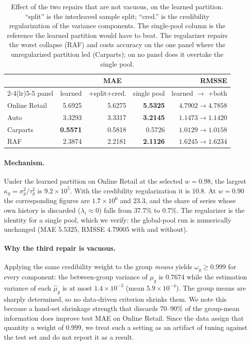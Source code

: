 \documentclass[twocolumn,10pt]{article}
\newcommand{\best}[1]{\textbf{#1}}
\begin{document}
\begin{table}[t]
\centering
\caption{Effect of the two repairs that are not vacuous, on the learned
partition. ``split'' is the interleaved sample split; ``cred.'' is the
credibility regularization of the variance components. The single-pool
column is the reference the learned partition would have to beat. The
regularizer repairs the worst collapse (RAF) and costs accuracy on the
one panel where the unregularized partition led (Carparts); on no panel
does it overtake the single pool.}
\label{tab:repairs}
\begin{tabular}{lrrrr}
\toprule
& \multicolumn{3}{c}{MAE} & RMSSE\\
\cmidrule(lr){2-4}\cmidrule(lr){5-5}
panel & learned & \;+split+cred. & single pool & learned $\to$ +both\\
\midrule
Online Retail & 5.6925 & 5.6275 & \best{5.5325} & $4.7902\to4.7858$\\
Auto & 3.3293 & 3.3317 & \best{3.2145} & $1.1473\to1.1420$\\
Carparts & \best{0.5571} & 0.5818 & 0.5726 & $1.0129\to1.0158$\\
RAF & 2.3874 & 2.2181 & \best{2.1126} & $1.6245\to1.6234$\\
\bottomrule
\end{tabular}
\end{table}

\paragraph{Mechanism.} Under the learned partition on Online Retail at
the selected $w=0.98$, the largest $\kappa_g=\sigma_g^2/\tau_g^2$ is
$9.2\times10^{5}$. With the credibility regularization it is $10.8$. At
$w=0.90$ the corresponding figures are $1.7\times10^{6}$ and $23.3$, and
the share of series whose own history is discarded
($\lambda_i\approx0$) falls from $37.7\%$ to $0.7\%$. The regularizer is
the identity for a single pool, which we verify: the global-pool run is
numerically unchanged (MAE $5.5325$, RMSSE $4.79005$ with and without).

\paragraph{Why the third repair is vacuous.} Applying the same
credibility weight to the group \emph{means} yields $\omega_g\ge0.999$
for every component: the between-group variance of $\mu_g$ is $0.7674$
while the estimation variance of each $\hat\mu_g$ is at most
$1.4\times10^{-3}$ (mean $5.9\times10^{-4}$). The group means are
sharply determined, so no data-driven criterion shrinks them. We note
this because a hand-set shrinkage strength that discards $70$--$90\%$ of
the group-mean information does improve test MAE on Online Retail. Since
the data assign that quantity a weight of $0.999$, we treat such a
setting as an artifact of tuning against the test set and do not report
it as a result.
\end{document}
